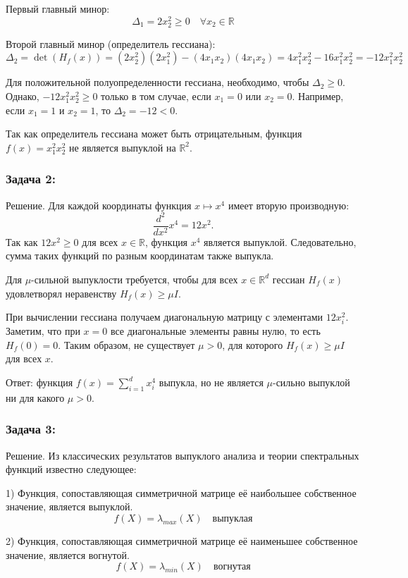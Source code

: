 \documentclass[a4paper,12pt]{article}
\begin{document}
	Первый главный минор:
	$$
	\Delta_1 = 2x_2^2 \ge 0 \quad \forall x_2 \in \mathbb{R}
	$$
	
	Второй главный минор (определитель гессиана):
	$$
	\Delta_2 = \det(H_f(x)) = (2x_2^2)(2x_1^2) - (4x_1 x_2)(4x_1 x_2) = 4x_1^2 x_2^2 - 16x_1^2 x_2^2 = -12x_1^2 x_2^2
	$$
	
	Для положительной полуопределенности гессиана, необходимо, чтобы $\Delta_2 \ge 0$. Однако, $-12x_1^2 x_2^2 \ge 0$ только в том случае, если $x_1 = 0$ или $x_2 = 0$. Например, если $x_1 = 1$ и $x_2 = 1$, то $\Delta_2 = -12 < 0$.
	
	Так как определитель гессиана может быть отрицательным, функция $f(x) = x_1^2 x_2^2$ не является выпуклой на $\mathbb{R}^2$.
	
	\subsubsection*{Задача 2:}
	
	Решение. Для каждой координаты функция $x \mapsto x^4$ имеет вторую производную:
	$$
	\frac{d^2}{dx^2} x^4 = 12x^2.
	$$
	Так как $12x^2 \ge 0$ для всех $x \in \mathbb{R}$, функция $x^4$ является выпуклой. Следовательно, сумма таких функций по разным координатам также выпукла.
	
	Для $\mu$-сильной выпуклости требуется, чтобы для всех $x \in \mathbb{R}^d$ гессиан $H_f(x)$ удовлетворял неравенству $H_f(x) \ge \mu I$.
	
	При вычислении гессиана получаем диагональную матрицу с элементами $12x_i^2$. Заметим, что при $x = 0$ все диагональные элементы равны нулю, то есть $H_f(0) = 0$. Таким образом, не существует $\mu > 0$, для которого $H_f(x) \ge \mu I$ для всех $x$.
	
	Ответ: функция $f(x) = \sum_{i=1}^{d}x_i^4$ выпукла, но не является $\mu$-сильно выпуклой ни для какого $\mu > 0$.
	
	\subsubsection*{Задача 3:}
	
	Решение. Из классических результатов выпуклого анализа и теории спектральных функций известно следующее:
	
	1) Функция, сопоставляющая симметричной матрице её наибольшее собственное значение, является выпуклой.
	$$
	f(X) = \lambda_{max}(X) \quad \text{выпуклая}
	$$
	
	2) Функция, сопоставляющая симметричной матрице её наименьшее собственное значение, является вогнутой.
	$$
	f(X) = \lambda_{min}(X) \quad \text{вогнутая}
	$$
	
\end{document}
